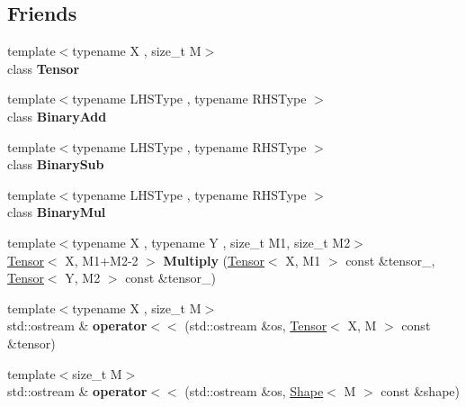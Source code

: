 \subsection*{Friends}
\begin{DoxyCompactItemize}
\item 
{\footnotesize template$<$typename X , size\+\_\+t M$>$ }\\class {\bfseries Tensor}\hypertarget{classtensor_1_1Shape_af4a07134de1525172d3c60c57e8f1496}{}\label{classtensor_1_1Shape_af4a07134de1525172d3c60c57e8f1496}

\item 
{\footnotesize template$<$typename L\+H\+S\+Type , typename R\+H\+S\+Type $>$ }\\class {\bfseries Binary\+Add}\hypertarget{classtensor_1_1Shape_a4d665549d16efb911a856dc6fd122618}{}\label{classtensor_1_1Shape_a4d665549d16efb911a856dc6fd122618}

\item 
{\footnotesize template$<$typename L\+H\+S\+Type , typename R\+H\+S\+Type $>$ }\\class {\bfseries Binary\+Sub}\hypertarget{classtensor_1_1Shape_afc63fe61d41c24c197bbf470274e78c5}{}\label{classtensor_1_1Shape_afc63fe61d41c24c197bbf470274e78c5}

\item 
{\footnotesize template$<$typename L\+H\+S\+Type , typename R\+H\+S\+Type $>$ }\\class {\bfseries Binary\+Mul}\hypertarget{classtensor_1_1Shape_a4e70ecf474c03f7e2051b75bb9af6110}{}\label{classtensor_1_1Shape_a4e70ecf474c03f7e2051b75bb9af6110}

\item 
{\footnotesize template$<$typename X , typename Y , size\+\_\+t M1, size\+\_\+t M2$>$ }\\\hyperlink{classtensor_1_1Tensor}{Tensor}$<$ X, M1+M2-\/2 $>$ {\bfseries Multiply} (\hyperlink{classtensor_1_1Tensor}{Tensor}$<$ X, M1 $>$ const \&tensor\+\_, \hyperlink{classtensor_1_1Tensor}{Tensor}$<$ Y, M2 $>$ const \&tensor\+\_)\hypertarget{classtensor_1_1Shape_a444e6496f2d094a932c9df8bd2b6b845}{}\label{classtensor_1_1Shape_a444e6496f2d094a932c9df8bd2b6b845}

\item 
{\footnotesize template$<$typename X , size\+\_\+t M$>$ }\\std\+::ostream \& {\bfseries operator$<$$<$} (std\+::ostream \&os, \hyperlink{classtensor_1_1Tensor}{Tensor}$<$ X, M $>$ const \&tensor)\hypertarget{classtensor_1_1Shape_a0f115749dac82f6918f1dae9e1a8f20c}{}\label{classtensor_1_1Shape_a0f115749dac82f6918f1dae9e1a8f20c}

\item 
{\footnotesize template$<$size\+\_\+t M$>$ }\\std\+::ostream \& {\bfseries operator$<$$<$} (std\+::ostream \&os, \hyperlink{classtensor_1_1Shape}{Shape}$<$ M $>$ const \&shape)\hypertarget{classtensor_1_1Shape_ad2fb927390677d5993c325a952a67b48}{}\label{classtensor_1_1Shape_ad2fb927390677d5993c325a952a67b48}

\end{DoxyCompactItemize}


